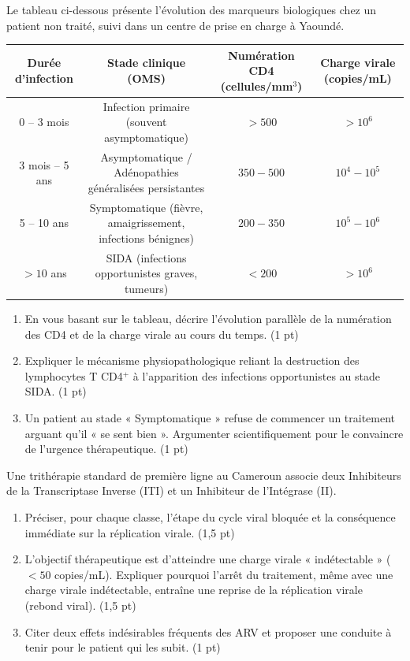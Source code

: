 \documentclass[11pt]{article}
\begin{document}
\begin{exercice}
Le tableau ci-dessous présente l'évolution des marqueurs biologiques chez un patient non traité, suivi dans un centre de prise en charge à Yaoundé.

\begin{tabular}{|c|c|c|c|}
\hline
\textbf{Durée d'infection} & \textbf{Stade clinique (OMS)} & \textbf{Numération CD4 (cellules/mm$^3$)} & \textbf{Charge virale (copies/mL)} \\
\hline
0 -- 3 mois & Infection primaire (souvent asymptomatique) & $> 500$ & $> 10^6$ \\
\hline
3 mois -- 5 ans & Asymptomatique / Adénopathies généralisées persistantes & $350 - 500$ & $10^4 - 10^5$ \\
\hline
5 -- 10 ans & Symptomatique (fièvre, amaigrissement, infections bénignes) & $200 - 350$ & $10^5 - 10^6$ \\
\hline
$> 10$ ans & SIDA (infections opportunistes graves, tumeurs) & $< 200$ & $> 10^6$ \\
\hline
\end{tabular}

\begin{enumerate}
    \item En vous basant sur le tableau, décrire l'évolution parallèle de la numération des CD4 et de la charge virale au cours du temps. \hfill (1 pt)
    \item Expliquer le mécanisme physiopathologique reliant la destruction des lymphocytes T CD4$^+$ à l'apparition des infections opportunistes au stade SIDA. \hfill (1 pt)
    \item Un patient au stade « Symptomatique » refuse de commencer un traitement arguant qu'il « se sent bien ». Argumenter scientifiquement pour le convaincre de l'urgence thérapeutique. \hfill (1 pt)
\end{enumerate}
\end{exercice}

\begin{exercice}
Une trithérapie standard de première ligne au Cameroun associe deux Inhibiteurs de la Transcriptase Inverse (ITI) et un Inhibiteur de l'Intégrase (II).
\begin{enumerate}
    \item Préciser, pour chaque classe, l'étape du cycle viral bloquée et la conséquence immédiate sur la réplication virale. \hfill (1,5 pt)
    \item L'objectif thérapeutique est d'atteindre une charge virale « indétectable » ($< 50$ copies/mL). Expliquer pourquoi l'arrêt du traitement, même avec une charge virale indétectable, entraîne une reprise de la réplication virale (rebond viral). \hfill (1,5 pt)
    \item Citer deux effets indésirables fréquents des ARV et proposer une conduite à tenir pour le patient qui les subit. \hfill (1 pt)
\end{enumerate}
\end{exercice}
\end{document}
